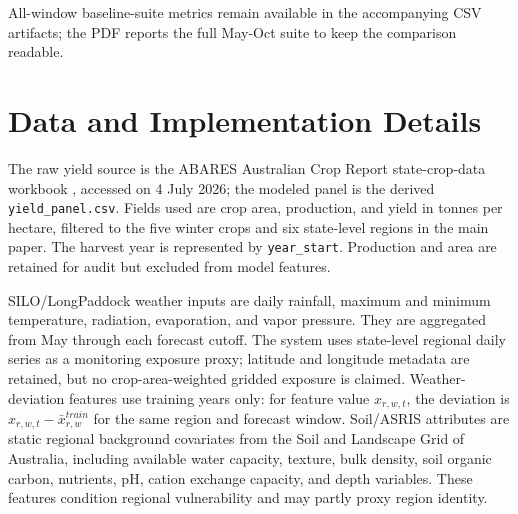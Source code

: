 \documentclass[wcp]{jmlr}
\begin{document}
\begin{table}[H]
\centering
\caption{Missing source yield entries by state-crop series. The total confirms 966 observed entries out of 990 possible state-crop-year combinations in 1989--2021 for the observed crop-region pairs.}

\end{table}



All-window baseline-suite metrics remain available in the accompanying CSV artifacts; the PDF reports the full May-Oct suite to keep the comparison readable.

\begin{table}[H]
\centering
\caption{Detailed stress-validation summary by validation protocol and feature regime. Rows report mean performance across the folds and forecast windows belonging to each protocol; the held-out-test row is an all-window stress summary, not the May-Oct-only result in the main lead-time comparison.}
\resizebox{\textwidth}{!}{}
\end{table}

\section{Data and Implementation Details}

The raw yield source is the ABARES Australian Crop Report state-crop-data workbook , accessed on 4 July 2026; the modeled panel is the derived \texttt{yield\_panel.csv}. Fields used are crop area, production, and yield in tonnes per hectare, filtered to the five winter crops and six state-level regions in the main paper. The harvest year is represented by \texttt{year\_start}. Production and area are retained for audit but excluded from model features.

SILO/LongPaddock weather inputs are daily rainfall, maximum and minimum temperature, radiation, evaporation, and vapor pressure. They are aggregated from May through each forecast cutoff. The system uses state-level regional daily series as a monitoring exposure proxy; latitude and longitude metadata are retained, but no crop-area-weighted gridded exposure is claimed. Weather-deviation features use training years only: for feature value $x_{r,w,t}$, the deviation is $x_{r,w,t}-\bar{x}_{r,w}^{train}$ for the same region and forecast window. Soil/ASRIS attributes are static regional background covariates from the Soil and Landscape Grid of Australia, including available water capacity, texture, bulk density, soil organic carbon, nutrients, pH, cation exchange capacity, and depth variables. These features condition regional vulnerability and may partly proxy region identity.
\end{document}
